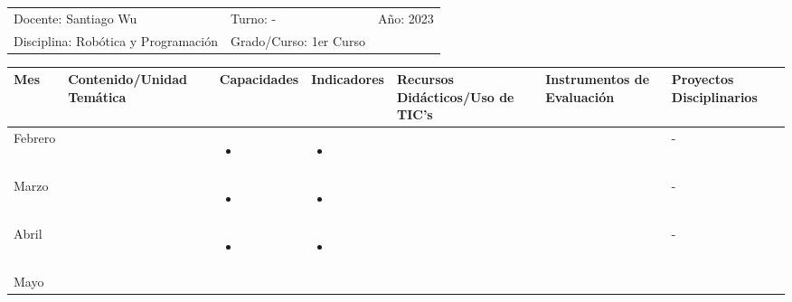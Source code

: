 \documentclass[landscape, a4paper, 10pt]{article}
\newcommand{\smallcellwidth}{0.7in}
\newcommand{\normalcellwidth}{1.2in}
\newcommand{\bigcellwidth}{2.0in}
\newcommand{\profesor}{Santiago Wu}
\newcommand{\discipline}{Robótica y Programación}
\newcommand{\currentyear}{2023}
\begin{document}
	\pagebreak[4]
	\begin{tabularx}{\textwidth}{ >{\raggedright\arraybackslash}X >{\raggedright\arraybackslash}X >{\raggedright\arraybackslash}X }
		Docente: \profesor &
		Turno: - &
		Año: \currentyear \\
		Disciplina: \discipline &
		Grado/Curso: 1er Curso &
		 \\
	\end{tabularx}
	\centering
	\begin{longtable}{|m{\smallcellwidth}|p{\normalcellwidth}|p{\bigcellwidth}|p{\bigcellwidth}|p{\normalcellwidth}|p{\normalcellwidth}|p{\normalcellwidth}|}
		\hline
		\textbf{Mes} &
		\textbf{Contenido/Unidad Temática} &
		\textbf{Capacidades} &
		\textbf{Indicadores} &
		\textbf{Recursos Didácticos/Uso de TIC's} &
		\textbf{Instrumentos de Evaluación} &
		\textbf{Proyectos Disciplinarios} \\
		\hline
		\endhead
		Febrero &
		 &
		\begin{itemize}
			\item 
		\end{itemize} &
		\begin{itemize}
			\item 
		\end{itemize} &
		  &
		  &
		 - \\
		\hline
		Marzo &
		 &
		\begin{itemize}
			\item 
		\end{itemize} &
		\begin{itemize}
			\item 
		\end{itemize} &
		  &
		  &
		 - \\
		\hline
		Abril &
		 &
		\begin{itemize}
			\item 
		\end{itemize} &
		\begin{itemize}
			\item 
		\end{itemize} &
		  &
		  &
		 - \\
		\hline
		Mayo &
		 &
		\begin{itemize}

\end{itemize}
\end{longtable}
\end{document}

